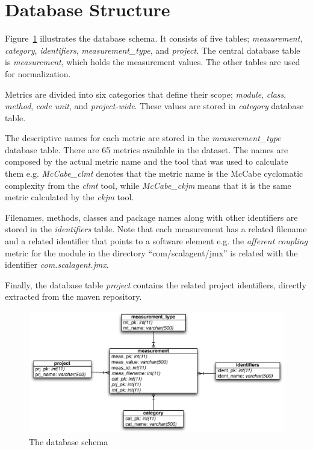 \documentclass{sig-alternate}
\begin{document}
\section{Database Structure}
\label{sec:db}

Figure~\ref{fig:database-schema} illustrates the database schema. It consists of five tables; \textit{measurement}, \textit{category}, \textit{identifiers}, \textit{measurement\_type}, and \textit{project}. The central database table is \textit{measurement}, which holds the measurement values. The other tables are used for normalization.

Metrics are divided into six categories that define their scope; \textit{module}, \textit{class}, \textit{method}, \textit{code unit}, and \textit{project-wide}. These values are stored in \textit{category} database table.

The descriptive names for each metric are stored in the \textit{measurement\_type} database table. There are 65 metrics available in the dataset. The names are composed by the actual metric name and the tool that was used to calculate them e.g. \textit{McCabe\_clmt} denotes that the metric name is the McCabe cyclomatic complexity from the \textit{clmt} tool, while \textit{McCabe\_ckjm} means that it is the same metric calculated by the \textit{ckjm} tool.

Filenames, methods, classes and package names along with other identifiers are stored in the \textit{identifiers} table. Note that each measurement has a related filename and a related identifier that points to a software element e.g. the \textit{afferent coupling} metric for the module in the directory ``com/scalagent/jmx'' is related with the identifier \textit{com.scalagent.jmx}.

Finally, the database table \textit{project} contains the related project identifiers, directly extracted from the maven repository.

\begin{figure}
\centering
\includegraphics[scale=0.7]{database-schema}
\caption{The database schema}
\label{fig:database-schema}
\end{figure}
\end{document}
